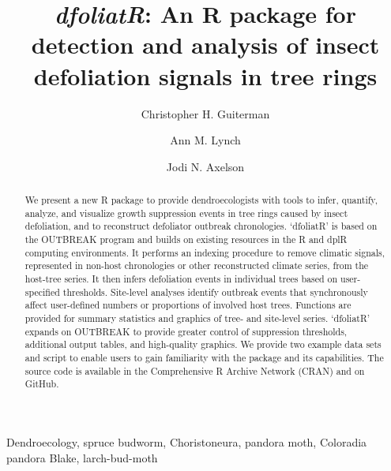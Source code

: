 \documentclass[review]{elsarticle} %
\begin{document}
\begin{frontmatter}

  \title{\emph{dfoliatR}: An R package for detection and analysis of insect defoliation signals in tree rings}
    \author[a,b]{Christopher H. Guiterman}
    \author[a,c]{Ann M. Lynch}
    \author[c]{Jodi N. Axelson}
      \address[a]{Laboratory of Tree-Ring Research, University of Arizona, 1215 E Lowell St.~Box 210045, Tucson, AZ, 85721}
    \address[b]{Three Pines Forest Research, LLC, PO Box 225, Etna, NH, 03750}
    \address[c]{U.S. Forest Service, Rocky Mountain Research Station, 1215 E Lowell St.~Box 210045, Tucson, AZ, 85721}
    \address[d]{Dept of Environmental Science, Policy \& Management, University of California, Berkeley, Berkeley, CA 94720}
  
  \begin{abstract}
  We present a new R package to provide dendroecologists with tools to infer, quantify, analyze, and visualize growth suppression events in tree rings caused by insect defoliation, and to reconstruct defoliator outbreak chronologies. `dfoliatR' is based on the OUTBREAK program and builds on existing resources in the R and dplR computing environments. It performs an indexing procedure to remove climatic signals, represented in non-host chronologies or other reconstructed climate series, from the host-tree series. It then infers defoliation events in individual trees based on user-specified thresholds. Site-level analyses identify outbreak events that synchronously affect user-defined numbers or proportions of involved host trees. Functions are provided for summary statistics and graphics of tree- and site-level series. `dfoliatR' expands on OUTBREAK to provide greater control of suppression thresholds, additional output tables, and high-quality graphics. We provide two example data sets and script to enable users to gain familiarity with the package and its capabilities. The source code is available in the Comprehensive R Archive Network (CRAN) and on GitHub.
  
  \hfill\break
  \end{abstract}
   \begin{keyword} Dendroecology, spruce budworm, Choristoneura, pandora moth, Coloradia pandora Blake, larch-bud-moth
\newpage\end{keyword}
 \end{frontmatter}
\end{document}
